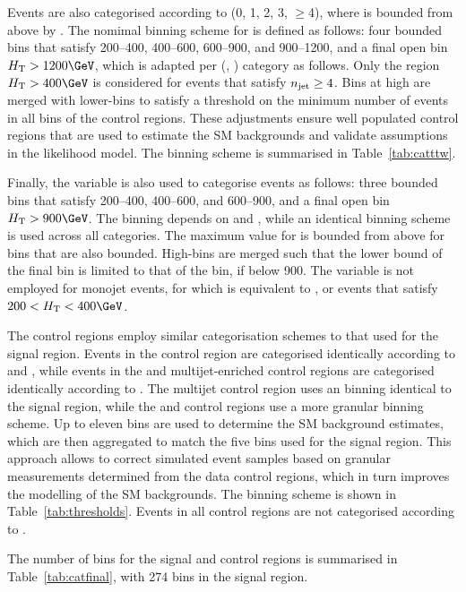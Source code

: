 Events are also categorised according to \nb (0, 1, 2, 3, $\geq$4),
where \nb is bounded from above by \njet. The nomimal binning scheme
for \scalht is defined as follows: four bounded bins that satisfy
200--400, 400--600, 600--900, and 900--1200\GeV, and a final open bin
$\scalht > 1200\GeV$, which is adapted per (\njet, \nb) category as
follows. Only the region $\scalht > 400\GeV$ is considered for events
that satisfy $n_{\mathrm{jet}} \geq 4$. Bins at high \scalht are merged with
lower-\scalht bins to satisfy a threshold on the minimum number of
events in all bins of the control regions. These adjustments ensure
well populated control regions that are used to estimate the SM
backgrounds and validate assumptions in the likelihood model. The
binning scheme is summarised in Table~\ref{tab:catttw}.

Finally, the \mht variable is also used to categorise events as
follows: three bounded bins that satisfy 200--400, 400--600, and
600--900, and a final open bin $\scalht > 900\GeV$. The \mht binning
depends on \njet and \scalht, while an identical binning scheme is
used across all \nb categories. The maximum value for \mht is bounded
from above for \scalht bins that are also bounded. High-\mht bins are
merged such that the lower bound of the final bin is limited to that
of the \scalht bin, if below 900\GeV. The \mht variable is not
employed for monojet events, for which \mht is equivalent to \scalht,
or events that satisfy $200 < \scalht < 400\GeV$.

The control regions employ similar categorisation schemes to that used
for the signal region. Events in the \mj control region are
categorised identically according to \njet and \nb, while events in
the \mmj and multijet-enriched control regions are categorised
identically according to \njet. The multijet control region uses an
\scalht binning identical to the signal region, while the \mj and \mmj
control regions use a more granular binning scheme. Up to eleven bins
are used to determine the SM background estimates, which are then
aggregated to match the five \scalht bins used for the signal region.
This approach allows to correct simulated event samples based on
granular measurements determined from the data control regions, which
in turn improves the modelling of the SM backgrounds. The \scalht
binning scheme is shown in Table~\ref{tab:thresholds}. Events in all
control regions are not categorised according to \mht.

The number of bins for the signal and control regions is summarised in
Table~\ref{tab:catfinal}, with 274 bins in the signal region. 

